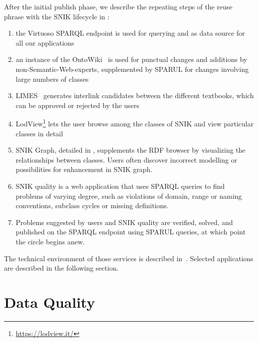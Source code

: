 \documentclass[sw]{iosart2x}
\renewcommand{\citet}{\cite}%
\renewcommand{\citep}{\cite}%
\begin{document}
After the initial publish phase, we describe the repeating steps of the reuse phrase with the SNIK lifecycle in :
\begin{enumerate}
\item the Virtuoso SPARQL endpoint is used for querying and as data source for all our applications  
\item an instance of the OntoWiki~\citep{ontowiki} is used for punctual changes and additions by non-Semantic-Web-experts, supplemented by SPARUL for changes involving large numbers of classes 
\item LIMES~\citep{limes} generates interlink candidates between the different textbooks, which can be approved or rejected by the users
\item LodView\footnote{\url{https://lodview.it/}} lets the user browse among the classes of SNIK and view particular classes in detail
\item SNIK Graph, detailed in , supplements the RDF browser by visualizing the relationships between classes.
Users often discover incorrect modelling or possibilities for enhancement in SNIK graph.
\item SNIK quality is a web application that uses SPARQL queries to find problems of varying degree, such as violations of domain, range or naming conventions, subclass cycles or missing definitions.
\item Problems suggested by users and SNIK quality are verified, solved, and published on the SPARQL endpoint using SPARUL queries, at which point the circle begins anew.
\end{enumerate}

The technical environment of those services is described in~\citet{sniktec}.
Selected applications are described in the following section.


\section{Data Quality}
\end{document}
